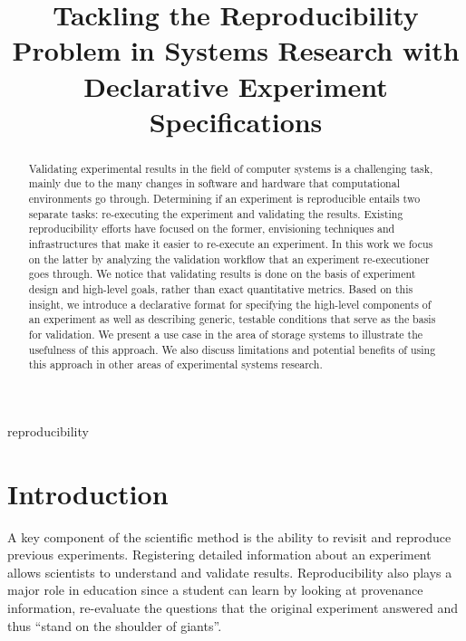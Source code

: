 \documentclass[10pt,reprint]{sigplanconf}
\title{Tackling the Reproducibility Problem in Systems Research with
Declarative Experiment Specifications}
\date{}
\begin{document}

\maketitle


\begin{abstract}
Validating experimental results in the field of computer systems is a
challenging task, mainly due to the many changes in software and
hardware that computational environments go through. Determining if an
experiment is reproducible entails two separate tasks: re-executing the
experiment and validating the results. Existing reproducibility efforts
have focused on the former, envisioning techniques and infrastructures
that make it easier to re-execute an experiment. In this work we focus
on the latter by analyzing the validation workflow that an experiment
re-executioner goes through. We notice that validating results is done
on the basis of experiment design and high-level goals, rather than
exact quantitative metrics. Based on this insight, we introduce a
declarative format for specifying the high-level components of an
experiment as well as describing generic, testable conditions that serve
as the basis for validation. We present a use case in the area of
storage systems to illustrate the usefulness of this approach. We also
discuss limitations and potential benefits of using this approach in
other areas of experimental systems research.
\end{abstract}



\keywords  reproducibility





\section{Introduction}\label{introduction}

A key component of the scientific method is the ability to revisit and
reproduce previous experiments. Registering detailed information about
an experiment allows scientists to understand and validate results.
Reproducibility also plays a major role in education since a student can
learn by looking at provenance information, re-evaluate the questions
that the original experiment answered and thus ``stand on the shoulder
of giants''.
\end{document}
